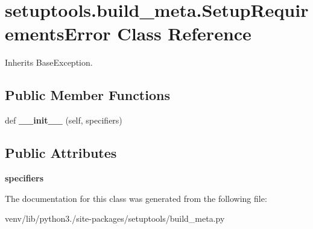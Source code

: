 \hypertarget{classsetuptools_1_1build__meta_1_1_setup_requirements_error}{}\section{setuptools.\+build\+\_\+meta.\+Setup\+Requirements\+Error Class Reference}
\label{classsetuptools_1_1build__meta_1_1_setup_requirements_error}


Inherits Base\+Exception.

\subsection*{Public Member Functions}
\begin{DoxyCompactItemize}
\item 
\mbox{\label{classsetuptools_1_1build__meta_1_1_setup_requirements_error_a02692bc734258a3cfbe2d44c32ee1f25}} 
def {\bfseries \+\_\+\+\_\+init\+\_\+\+\_\+} (self, specifiers)
\end{DoxyCompactItemize}
\subsection*{Public Attributes}
\begin{DoxyCompactItemize}
\item 
\mbox{\label{classsetuptools_1_1build__meta_1_1_setup_requirements_error_ab8d760d963fece58db336de3d5444615}} 
{\bfseries specifiers}
\end{DoxyCompactItemize}


The documentation for this class was generated from the following file\+:\begin{DoxyCompactItemize}
\item 
venv/lib/python3./site-\/packages/setuptools/build\+\_\+meta.\+py\end{DoxyCompactItemize}

